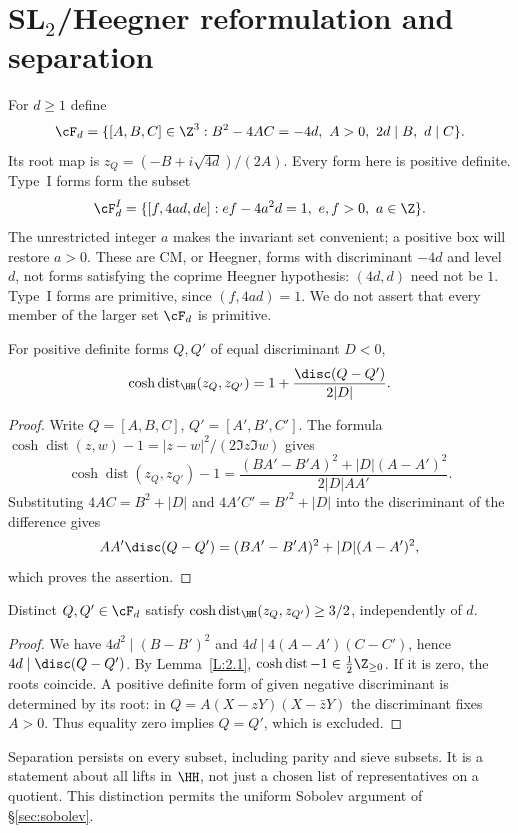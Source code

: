 \section{SL$_2$/Heegner reformulation and separation}\label{sec:heegner}
For $d\ge1$ define
\[
 \cF_d=\{[A,B,C]\in\Z^3:B^2-4AC=-4d,\ A>0,
                         \ 2d\mid B,\ d\mid C\}.
\]
Its root map is $z_Q=(-B+i\sqrt{4d})/(2A)$.
Every form here is positive definite. Type~I forms form the subset
\[
 \cF_d^I=\{[f,4ad,de]:ef-4a^2d=1,\ e,f>0,\ a\in\Z\}.
\]
The unrestricted integer $a$ makes the invariant set convenient; a positive
box will restore $a>0$. These are CM, or Heegner, forms with discriminant
$-4d$ and level $d$, not forms satisfying the coprime Heegner hypothesis:
$(4d,d)$ need not be $1$. Type~I forms are primitive, since $(f,4ad)=1$.
We do not assert that every member of the larger set $\cF_d$ is primitive.

\begin{lemma}\label{L:2.1}
For positive definite forms $Q,Q'$ of equal discriminant $D<0$,
\[
 \cosh\operatorname{dist}_{\HH}(z_Q,z_{Q'})
             =1+\frac{\disc(Q-Q')}{2|D|}.
\]
\end{lemma}
\begin{proof}
Write $Q=[A,B,C]$, $Q'=[A',B',C']$. The formula
$\cosh\operatorname{dist}(z,w)-1=|z-w|^2/(2\Im z\Im w)$ gives
\[
 \cosh\operatorname{dist}(z_Q,z_{Q'})-1
 =\frac{(BA'-B'A)^2+|D|(A-A')^2}{2|D|AA'}.
\]
Substituting $4AC=B^2+|D|$ and $4A'C'=B'^2+|D|$ into the discriminant
of the difference gives
\[
 AA'\disc(Q-Q')=(BA'-B'A)^2+|D|(A-A')^2,
\]
which proves the assertion.
\end{proof}
\begin{lemma}\label{L:2.2}
Distinct $Q,Q'\in\cF_d$ satisfy
$\cosh\operatorname{dist}_{\HH}(z_Q,z_{Q'})\ge3/2$, independently of $d$.
\end{lemma}
\begin{proof}
We have $4d^2\mid(B-B')^2$ and $4d\mid4(A-A')(C-C')$, hence
$4d\mid\disc(Q-Q')$. By Lemma~\ref{L:2.1},
$\cosh\operatorname{dist}-1\in\frac12\Z_{\ge0}$.
If it is zero, the roots coincide. A positive definite form of given
negative discriminant is determined by its root: in
$Q=A(X-zY)(X-\bar zY)$ the discriminant fixes $A>0$.
Thus equality zero implies $Q=Q'$, which is excluded.
\end{proof}
Separation persists on every subset, including parity and sieve subsets.
It is a statement about all lifts in $\HH$, not just a chosen list of
representatives on a quotient. This distinction permits the uniform
Sobolev argument of \S\ref{sec:sobolev}.

